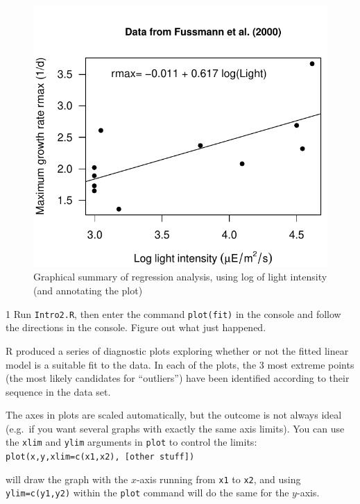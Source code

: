 \documentclass[11pt,]{article}
\let\BeginKnitrBlock\begin \let\EndKnitrBlock\end
\begin{document}
\begin{figure}
\centering
\includegraphics{Lab_1_modified_files/figure-latex/unnamed-chunk-29-1.pdf}
\caption{\label{fig:unnamed-chunk-29}Graphical summary of regression analysis, using log of light intensity (and annotating the plot)}
\end{figure}

\BeginKnitrBlock{exercisebox}{1}
Run \texttt{Intro2.R}, then enter the command \texttt{plot(fit)} in the console and follow the directions in the console. Figure out what just happened.
\EndKnitrBlock{exercisebox}

R produced a series of diagnostic plots exploring whether or not the fitted linear model is a suitable fit to the data. In each of the plots, the 3 most extreme points (the most likely candidates for ``outliers'') have been identified according to their sequence in the data set.

The axes in plots are scaled automatically, but the outcome is not always ideal (e.g.~if you want several graphs with exactly the same axis limits). You can use the \texttt{xlim} and \texttt{ylim} arguments in \texttt{plot} to control the limits:
\texttt{plot(x,y,xlim=c(x1,x2),\ {[}other\ stuff{]})}

will draw the graph with the \(x\)-axis running from \texttt{x1} to \texttt{x2}, and using \texttt{ylim=c(y1,y2)} within the \texttt{plot} command will do the same for the \(y\)-axis.
\end{document}
